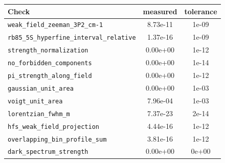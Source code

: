 \begin{tabular}{lcc}
\toprule
Check & measured & tolerance \\
\midrule
\texttt{weak\_field\_zeeman\_3P2\_cm-1} & 8.73e-11 & 1e-09 \\
\texttt{rb85\_5S\_hyperfine\_interval\_relative} & 1.37e-16 & 1e-09 \\
\texttt{strength\_normalization} & 0.00e+00 & 1e-12 \\
\texttt{no\_forbidden\_components} & 0.00e+00 & 1e-14 \\
\texttt{pi\_strength\_along\_field} & 0.00e+00 & 1e-12 \\
\texttt{gaussian\_unit\_area} & 0.00e+00 & 1e-03 \\
\texttt{voigt\_unit\_area} & 7.96e-04 & 1e-03 \\
\texttt{lorentzian\_fwhm\_m} & 7.37e-23 & 2e-14 \\
\texttt{hfs\_weak\_field\_projection} & 4.44e-16 & 1e-12 \\
\texttt{overlapping\_bin\_profile\_sum} & 3.81e-16 & 1e-12 \\
\texttt{dark\_spectrum\_strength} & 0.00e+00 & 0e+00 \\
\bottomrule
\end{tabular}
